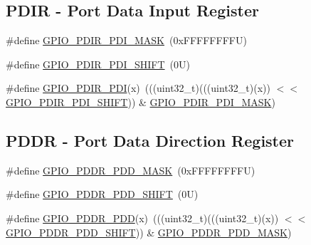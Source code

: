 \subsection*{P\+D\+IR -\/ Port Data Input Register}
\begin{DoxyCompactItemize}
\item 
\#define \mbox{\hyperlink{group___g_p_i_o___register___masks_gacb7c8cc976937906c8e803811a7fbb68}{G\+P\+I\+O\+\_\+\+P\+D\+I\+R\+\_\+\+P\+D\+I\+\_\+\+M\+A\+SK}}~(0x\+F\+F\+F\+F\+F\+F\+F\+F\+U)
\item 
\#define \mbox{\hyperlink{group___g_p_i_o___register___masks_ga99fd9212dd769bb1964a28a864c6c741}{G\+P\+I\+O\+\_\+\+P\+D\+I\+R\+\_\+\+P\+D\+I\+\_\+\+S\+H\+I\+FT}}~(0\+U)
\item 
\#define \mbox{\hyperlink{group___g_p_i_o___register___masks_ga8f80c8e42743151c73569b5cef49f2b2}{G\+P\+I\+O\+\_\+\+P\+D\+I\+R\+\_\+\+P\+DI}}(x)~(((uint32\+\_\+t)(((uint32\+\_\+t)(x)) $<$$<$ \mbox{\hyperlink{group___g_p_i_o___register___masks_ga99fd9212dd769bb1964a28a864c6c741}{G\+P\+I\+O\+\_\+\+P\+D\+I\+R\+\_\+\+P\+D\+I\+\_\+\+S\+H\+I\+FT}})) \& \mbox{\hyperlink{group___g_p_i_o___register___masks_gacb7c8cc976937906c8e803811a7fbb68}{G\+P\+I\+O\+\_\+\+P\+D\+I\+R\+\_\+\+P\+D\+I\+\_\+\+M\+A\+SK}})
\end{DoxyCompactItemize}
\subsection*{P\+D\+DR -\/ Port Data Direction Register}
\begin{DoxyCompactItemize}
\item 
\#define \mbox{\hyperlink{group___g_p_i_o___register___masks_ga67567a60f48d2bfb5584cd8de8936788}{G\+P\+I\+O\+\_\+\+P\+D\+D\+R\+\_\+\+P\+D\+D\+\_\+\+M\+A\+SK}}~(0x\+F\+F\+F\+F\+F\+F\+F\+F\+U)
\item 
\#define \mbox{\hyperlink{group___g_p_i_o___register___masks_gacdd12c96f7650759c90a98bb606bd776}{G\+P\+I\+O\+\_\+\+P\+D\+D\+R\+\_\+\+P\+D\+D\+\_\+\+S\+H\+I\+FT}}~(0\+U)
\item 
\#define \mbox{\hyperlink{group___g_p_i_o___register___masks_ga9836cb3ac719630f741fe6a0292083fc}{G\+P\+I\+O\+\_\+\+P\+D\+D\+R\+\_\+\+P\+DD}}(x)~(((uint32\+\_\+t)(((uint32\+\_\+t)(x)) $<$$<$ \mbox{\hyperlink{group___g_p_i_o___register___masks_gacdd12c96f7650759c90a98bb606bd776}{G\+P\+I\+O\+\_\+\+P\+D\+D\+R\+\_\+\+P\+D\+D\+\_\+\+S\+H\+I\+FT}})) \& \mbox{\hyperlink{group___g_p_i_o___register___masks_ga67567a60f48d2bfb5584cd8de8936788}{G\+P\+I\+O\+\_\+\+P\+D\+D\+R\+\_\+\+P\+D\+D\+\_\+\+M\+A\+SK}})
\end{DoxyCompactItemize}


